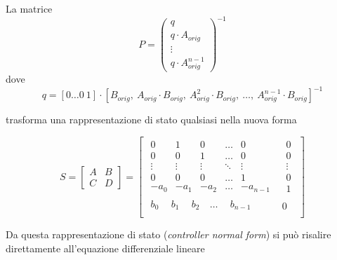 \documentclass[11pt]{article}
\begin{document}
La matrice \begin{equation}
P = {\begin{pmatrix}
q \\
q \cdot A_{orig} \\
\vdots \\
q \cdot A^{n-1}_{orig}
\end{pmatrix}}^{-1}
\end{equation} dove \begin{equation}
q = [0 \dots 0\ 1] \cdot [B_{orig},\ A_{orig} \cdot B_{orig},\ A^2_{orig} \cdot B_{orig},\ \dots,\ A^{n-1}_{orig} \cdot B_{orig}]^{-1}
\end{equation}

    trasforma una rappresentazione di stato qualsiasi nella nuova forma

\begin{equation}
    S =\left[
    \begin{array}{c|c}
      A & B\\
      \hline
      C & D
    \end{array}
    \right] = \left[
        \begin{array}{c|c}
         \begin{matrix}
          0 & 1 & 0 & \dots & 0 \\
          0 & 0 & 1 & \dots & 0 \\
          \vdots & \vdots & \vdots & \ddots & \vdots\\
          0 & 0 & 0 & \dots & 1 \\
          -a_0 & -a_1 & -a_2 & \dots & -a_{n-1}
         \end{matrix} 
         & \begin{matrix}
            0 \\
            0 \\
            \vdots \\
            0 \\
            1
         \end{matrix}
         \\
         \hline
         \begin{matrix}
            b_0\ \ & b_1\ &\ b_2&\ \dots &\ \ b_{n-1} \\
         \end{matrix} & 0
          \end{array}
    \right]
\end{equation}

    Da questa rappresentazione di stato (\emph{controller normal form}) si
può risalire direttamente all'equazione differenziale lineare
\end{document}
